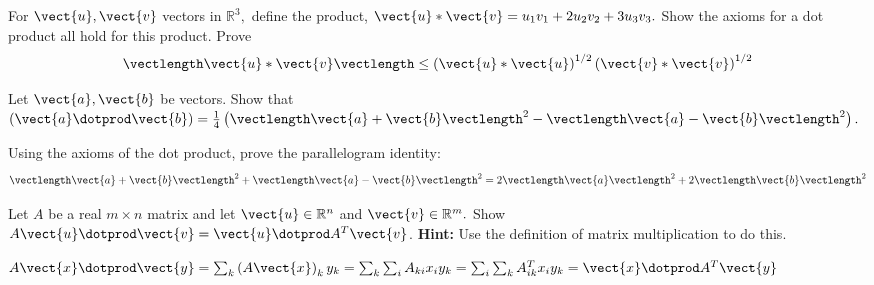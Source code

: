 \begin{enumialphparenastyle}
\begin{ex} For $\vect{u},\vect{v}$ vectors in $\mathbb{R}^{3},$ define the product, 
$\vect{u}\ast \vect{v} =  u_{1}v_{1}+2u_{2}v_{2}+3u_{3}v_{3}.$ Show the axioms
for a dot product all hold for this product. Prove
\begin{equation*}
\vectlength \vect{u}\ast \vect{v}\vectlength \leq \left( \vect{u}\ast \vect{u}\right)
^{1/2}\left( \vect{v}\ast \vect{v}\right) ^{1/2}
\end{equation*}
\end{ex}


\begin{ex} Let $\vect{a},\vect{b}$ be vectors. Show that $\left( \vect{a}\dotprod \vect{b}\right) =\frac{1}{4}\left( \vectlength
\vect{a}+\vect{b}\vectlength ^{2}-\vectlength \vect{a}-\vect{b}\vectlength ^{2}\right) .$
\end{ex}

\begin{ex} Using the axioms of the dot product, prove the parallelogram identity: 
\begin{equation*}
\vectlength \vect{a}+\vect{b}\vectlength ^{2}+\vectlength \vect{a}-\vect{b}\vectlength
^{2}=2\vectlength \vect{a}\vectlength ^{2}+2\vectlength \vect{b}
\vectlength ^{2}
\end{equation*}
\end{ex}

\begin{ex} \label{exerRn3}  Let $A$ be a real $m\times n$ matrix and
let $\vect{u}\in \mathbb{R}^{n}$ and $\vect{v}\in \mathbb{R}^{m}.$ Show 
$A\vect{u}\dotprod \vect{v}=\vect{u}\dotprod A^{T}\vect{v}$. 
\textbf{Hint:} Use the definition of matrix
multiplication to do this.
\begin{sol}
$A\vect{x}\dotprod \vect{y}=\sum_{k}\left( A\vect{x}
\right) _{k}y_{k}=\sum_{k}\sum_{i}A_{ki}x_{i}y_{k}=\sum_{i}
\sum_{k}A_{ik}^{T}x_{i}y_{k}= \vect{x} \dotprod A^{T}\vect{y} $
\end{sol}
\end{ex}


\end{enumialphparenastyle}
